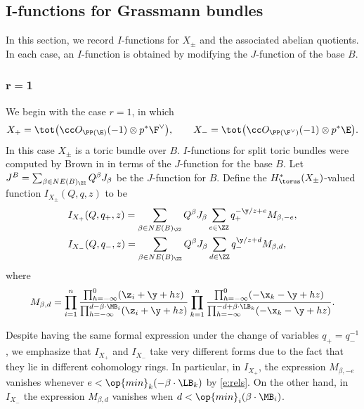 \subsection[I-functions for Grassmann bundles]{$\boldsymbol{I}$-functions for Grassmann bundles}
In this section, we record $I$-functions for $X_\pm$ and the associated abelian quotients. In each case, an $I$-function is obtained by modifying the $J$-function of the base $B$.

\subsubsection[r=1]{$\boldsymbol{r=1}$}
We begin with the case $r=1$,
in which
\begin{align*}
X_{+} = \tot \bigl( \cc O_{\PP(\E)}(-1) \otimes p^*\F^\vee\bigr),\qquad
X_{-} =\tot \bigl( \cc O_{\PP(\F^\vee)}(-1) \otimes p^*\E\bigr).
\end{align*}
In this case $X_{\pm}$ is a toric bundle over $B$. $I$-functions for split toric bundles were computed by Brown in \cite{Brown} in terms of the $J$-function for the base $B$. Let $J^B = \sum_{\beta \in NE(B)_\ZZ} Q^\beta J_\beta$ be the $J$-function for $B$. Define the $H^*_\torus(X_\pm)$-valued function $I_{X_\pm}(Q, q, z)$ to be
\begin{align*}
&I_{X_+}(Q, q_+, z) =\sum_{\beta \in NE(B)_\ZZ} Q^\beta J_\beta \sum_{e \in \ZZ} q_+^{-\y/z+e} M_{\beta, -e} ,\\
&I_{X_-}(Q, q_-, z) =\sum_{\beta \in NE(B)_\ZZ} Q^\beta J_\beta \sum_{d \in \ZZ} q_-^{\y/z+d} M_{\beta, d},
\end{align*}
where
\begin{equation}\label{hmod} M_{\beta, d} =
\prod_{i=1}^n \frac{\prod_{h=-\infty}^0 (\z_i+\y+hz)}{\prod_{h=-\infty}^{d-\beta\cdot \MB_i} (\z_i+\y+hz)}\prod_{k=1}^{n}\frac{\prod_{h=-\infty}^{0}(-\x_k -\y+hz)}{\prod_{h=-\infty}^{-d+\beta\cdot \LB_k}(-\x_k -\y+hz)}.\end{equation}
\begin{Remark}
Despite having the same formal expression under the change of variables $q_+ = q_-^{-1}$, we emphasize that $I_{X_+}$ and $I_{X_-}$ take very different forms due to the fact that they lie in different cohomology rings. In particular, in $I_{X_+}$, the expression $M_{\beta, -e}$ vanishes whenever $e < \op{min}_k(-\beta\cdot \LB_k)$ by \eqref{e:rels}. On the other hand, in $I_{X_-}$ the expression $M_{\beta, d}$ vanishes when $d < \op{min}_i(\beta\cdot \MB_i)$.

\end{Remark}

